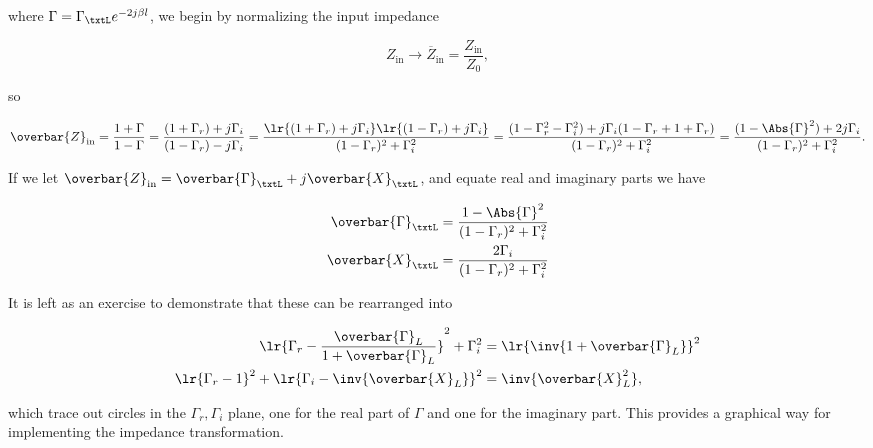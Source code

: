 where \( \Gamma = \Gamma_\txtL e^{- 2 j \beta l } \), we begin by normalizing the input impedance

\begin{equation}\label{eqn:uwavesDeck5SmithChartCore:380}
Z_{\textrm{in}} \rightarrow \overbar{Z}_{\textrm{in}} = \frac{Z_{\textrm{in}}}{Z_0}, 
\end{equation}

so

\begin{dmath}\label{eqn:uwavesDeck5SmithChartCore:400}
\overbar{Z}_{\textrm{in}} 
= \frac{ 1 + \Gamma }{ 1 - \Gamma }
= \frac{ (1 + \Gamma_r) + j \Gamma_i }{ (1 - \Gamma_r) - j \Gamma_i }
= \frac{ \lr{ (1 + \Gamma_r) + j \Gamma_i}\lr{(1 - \Gamma_r) + j \Gamma_i} }{ (1 - \Gamma_r)^2 + \Gamma_i^2 }
= \frac{ (1 - \Gamma_r^2 - \Gamma_i^2) + j \Gamma_i (1 - \Gamma_r + 1 + \Gamma_r ) }{ (1 - \Gamma_r)^2 + \Gamma_i^2 }
= \frac{ (1 - \Abs{\Gamma}^2) + 2 j \Gamma_i }{ (1 - \Gamma_r)^2 + \Gamma_i^2 }.
\end{dmath}

If we let \( \overbar{Z}_{\textrm{in}} = \overbar{\Gamma}_\txtL + j \overbar{X}_\txtL \), and equate real and imaginary parts we have

\begin{equation}\label{eqn:uwavesDeck5SmithChartCore:420}
\begin{aligned}
\overbar{\Gamma}_\txtL &= \frac{ 1 - \Abs{\Gamma}^2 }{ (1 - \Gamma_r)^2 + \Gamma_i^2 } \\
\overbar{X}_\txtL &= \frac{2 \Gamma_i }{ (1 - \Gamma_r)^2 + \Gamma_i^2 }
\end{aligned}
\end{equation}

It is left as an exercise to demonstrate that these can be rearranged into

\begin{equation}\label{eqn:uwavesDeck5SmithChartCore:440}
\begin{aligned}
\lr{ \Gamma_r - \frac{\overbar{\Gamma}_L}{1 + \overbar{\Gamma}_L } }^2 + \Gamma_i^2 &= \lr{ \inv{1 + \overbar{\Gamma}_L }}^2 \\
\lr{ \Gamma_r - 1 }^2 + \lr{ \Gamma_i - \inv{\overbar{X}_L } }^2 &= \inv{\overbar{X}_L^2},
\end{aligned}
\end{equation}

which trace out circles in the \( \Gamma_r, \Gamma_i \) plane, one for the real part of \( \Gamma \) and one for the imaginary part.  This provides a graphical way for implementing the impedance transformation.  

